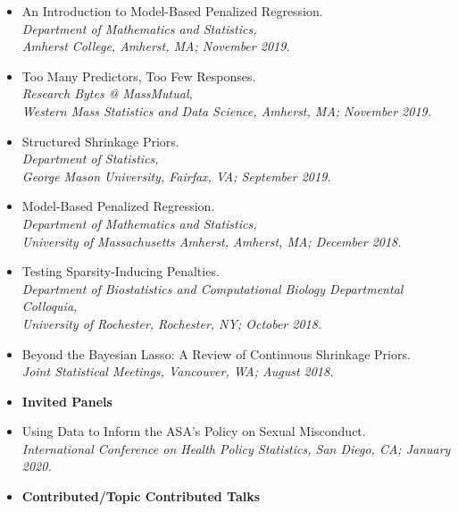 \documentclass[11pt]{article}
\newcommand{\tab}{\hspace*{2em}}
\begin{document}
\begin{itemize}
	\item[] An Introduction to Model-Based Penalized Regression. \\
	\tab \emph{Department of Mathematics and Statistics,}\\ 
	\tab \emph{Amherst College, Amherst, MA; November 2019.} \vspace{-2mm}
	\item[] Too Many Predictors, Too Few Responses. \\
	\tab \emph{Research Bytes @ MassMutual,}\\ 
	\tab \emph{Western Mass Statistics and Data Science, Amherst, MA; November 2019.} \vspace{-2mm}
	\item[] Structured Shrinkage Priors. \\
	\tab \emph{Department of Statistics,}\\ 
	\tab \emph{George Mason University, Fairfax, VA; September 2019.} \vspace{-2mm}
	\item[] Model-Based Penalized Regression. \\
	\tab \emph{Department of Mathematics and Statistics,}\\ 
	\tab \emph{University of Massachusetts Amherst, Amherst, MA; December 2018.} \vspace{-2mm}
	\item[] Testing Sparsity-Inducing Penalties. \\
	\tab \emph{Department of Biostatistics and Computational Biology Departmental Colloquia,}\\ 
	\tab \emph{University of Rochester, Rochester, NY; October 2018.} \vspace{-2mm}
	\item[] Beyond the Bayesian Lasso: A Review of Continuous Shrinkage Priors. \\
	\tab \emph{Joint Statistical Meetings, Vancouver, WA; August 2018.} \vspace{-2mm}
	\item[] \textbf{Invited Panels} \vspace{-2mm}
	\item[] Using Data to Inform the ASA's Policy on Sexual Misconduct. \\
	\tab \emph{International Conference on Health Policy Statistics, San Diego, CA; January 2020.} \vspace{-2mm}
	\item[] \textbf{Contributed/Topic Contributed Talks} \vspace{-2mm}

\end{itemize}
\end{document}
